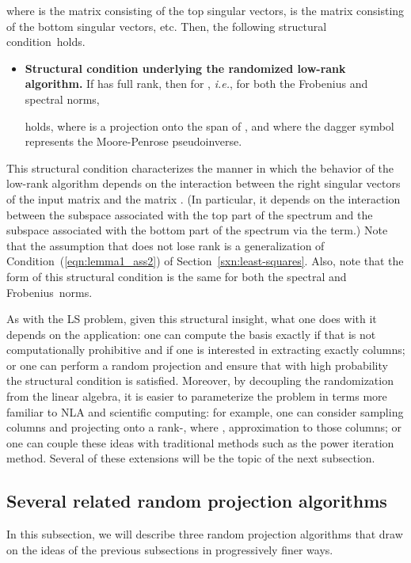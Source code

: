 \documentclass[twoside]{article}
\begin{document}
where  is the  matrix consisting of the top  singular 
vectors,  is the  matrix consisting of the bottom
 singular vectors, etc.
Then, the following structural condition~holds.
\begin{itemize}
\item
\textbf{Structural condition underlying the randomized low-rank algorithm.}
If  has full rank, then for , \emph{i.e.}, for both the 
Frobenius and spectral norms,

holds, where  is a projection onto the span of , and where the 
dagger symbol represents the Moore-Penrose pseudoinverse.
\end{itemize}
This structural condition characterizes the manner in which the behavior of 
the low-rank algorithm depends on the interaction between the right singular 
vectors of the input matrix and the matrix .
(In particular, it depends on the interaction between the subspace 
associated with the top part of the spectrum and the subspace associated 
with the bottom part of the spectrum via the 
 term.)
Note that the assumption that  does not lose rank is a
generalization of Condition~(\ref{eqn:lemma1_ass2}) of 
Section~\ref{sxn:least-squares}.
Also, note that the form of this structural condition is the same for both 
the spectral and Frobenius~norms.

As with the LS problem, given this structural insight, what one does with 
it depends on the application:
one can compute the basis  exactly if that is not computationally 
prohibitive and if one is interested in extracting exactly  columns; or
one can perform a random projection and ensure that with high probability 
the structural condition is satisfied.
Moreover, by decoupling the randomization from the linear algebra, it is 
easier to parameterize the problem in terms more familiar to NLA and 
scientific computing: for example, one can consider sampling  
columns and projecting onto a rank-, where , 
approximation to those columns; or one can couple these ideas with 
traditional methods such as the power iteration method.
Several of these extensions will be the topic of the next subsection.


\subsection{Several related random projection algorithms}
\label{sxn:low-rank:proj}

In this subsection, we will describe three random projection algorithms that 
draw on the ideas of the previous subsections in progressively finer ways.
\end{document}
